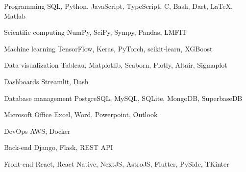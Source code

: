 
\begin{cvskills}

  \cvskill
  {Programming} %
  {SQL, Python, JavaScript, TypeScript, C, Bash, Dart, LaTeX, Matlab} %

  \cvskill
  {Scientific computing} %
  {NumPy, SciPy, Sympy, Pandas, LMFIT} %

  \cvskill
  {Machine learning} %
  {TensorFlow, Keras, PyTorch, scikit‑learn, XGBoost} %


  \cvskill
  {Data visualization} %
  {Tableau, Matplotlib, Seaborn, Plotly, Altair, Sigmaplot} %

  \cvskill
  {Dashboards} %
  {Streamlit, Dash} %

  \cvskill
  {Database management} %
  {PostgreSQL, MySQL, SQLite, MongoDB, SuperbaseDB} %

  \cvskill
  {Microsoft Office} %
  {Excel, Word, Powerpoint, Outlook} %

  \cvskill
  {DevOps} %
  {AWS, Docker} %

  \cvskill
  {Back-end} %
  {Django, Flask, REST API} %

  \cvskill
  {Front-end} %
  {React, React Native, NextJS, AstroJS, Flutter, PySide, TKinter} %


\end{cvskills}
